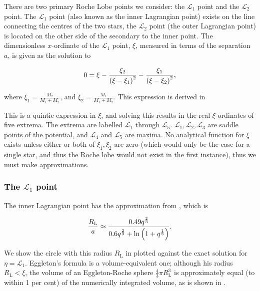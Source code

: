 There are two primary Roche Lobe points we consider: the $\mathcal{L}_1$ point and the $\mathcal{L}_2$ point. The $\mathcal{L}_1$ point (also known as the inner Lagrangian point) exists on the line connecting the centres of the two stars, the $\mathcal{L}_2$ point (the outer Lagrangian point) is located on the other side of the secondary to the inner point. The dimensionless $x$-ordinate of the $\mathcal{L}_1$ point, $\xi$, measured in terms of the separation $a$, is given as the solution to

\begin{equation}
    0=\xi-\frac{\xi_2}{\left(\xi-\xi_1\right)^2}-\frac{\xi_1}{\left(\xi-\xi_2\right)^2},\label{eq:roche_lobe_condition}
\end{equation}

where $\xi_1=\frac{M_2}{M_1+M_2}$, and $\xi_2=\frac{M_1}{M_1+M_2}$. This expression is derived in 

This is a quintic expression in $\xi$, and solving this results in the real $\xi$-ordinates of five extrema. The extrema are labelled $\mathcal{L}_1$ through $\mathcal{L}_5$. $\mathcal{L}_1, \mathcal{L}_2, \mathcal{L}_3$ are saddle points of the potential, and $\mathcal{L}_4$ and $\mathcal{L}_5$ are maxima. No analytical function for $\xi$ exists unless either or both of $\xi_1, \xi_2$ are zero (which would only be the case for a single star, and thus the Roche lobe would not exist in the first instance), thus we must make approximations.

\subsubsection{The \texorpdfstring{$\mathcal{L}_1$}{inner Lagrangian} point}

The inner Lagrangian point has the approximation from \citet{Eggleton:1983}, which is

\begin{equation}
    \frac{R_\text{L}}{a} \approx \frac{0.49q^\frac23}{0.6q^\frac23+\ln\left(1+q^\frac13\right)}.\label{eq:RL1_eggleton}
\end{equation}

We show the circle with this radius $R_\text{L}$ in  plotted against the exact solution for $\eta=\mathcal{L}_1$. Eggleton's formula is a volume-equivalent one; although his radius $R_\text{L} < \xi$, the volume of an Eggleton-Roche sphere $\frac43 \pi R_\text{L}^3$ is approximately equal (to within 1 per cent) of the numerically integrated volume, as is shown in .

